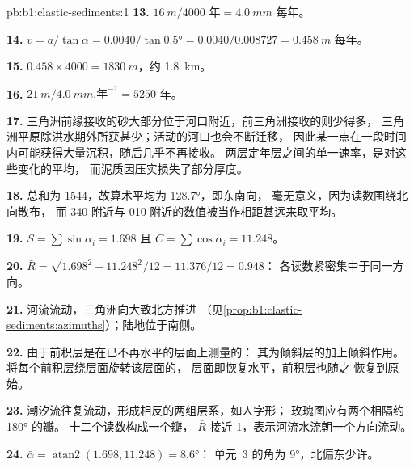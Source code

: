 \begin{solution}{pb:b1:clastic-sediments:1}
\textbf{13.} $\qty{16}{m}/\num{4000}\text{ 年} = \qty{4.0}{mm}$ 每年。

\textbf{14.} $v = a/\tan\alpha = 0.0040/\tan\ang{0.5} = 0.0040/0.008727 =
\qty{0.458}{m}$ 每年。

\textbf{15.} $0.458 \times 4000 = \qty{1830}{m}$，约 \qty{1.8}{km}。

\textbf{16.} $\qty{21}{m}/\qty{4.0}{mm.\text{年}^{-1}} = 5250$ 年。

\textbf{17.} 三角洲前缘接收的砂大部分位于河口附近，前三角洲接收的则少得多，
三角洲平原除洪水期外所获甚少；活动的河口也会不断迁移，
因此某一点在一段时间内可能获得大量沉积，随后几乎不再接收。
两层定年层之间的单一速率，是对这些变化的平均，
而泥质因压实损失了部分厚度。

\textbf{18.} 总和为 1544，故算术平均为 \ang{128.7}，即东南向，
毫无意义，因为读数围绕北向散布，
而 340 附近与 010 附近的数值被当作相距甚远来取平均。

\textbf{19.} $S = \sum\sin\alpha_i = 1.698$ 且 $C = \sum\cos\alpha_i =
11.248$。

\textbf{20.} $\bar R = \sqrt{1.698^2 + 11.248^2}/12 = 11.376/12 = 0.948$：
各读数紧密集中于同一方向。

\textbf{21.} 河流流动，三角洲向大致北方推进
（见\cref{prop:b1:clastic-sediments:azimuths}）；陆地位于南侧。

\textbf{22.} 由于前积层是在已不再水平的层面上测量的：
其为倾斜层的加上倾斜作用。
将每个前积层绕层面旋转该层面的，
层面即恢复水平，前积层也随之
恢复到原始。

\textbf{23.} 潮汐流往复流动，形成相反的两组层系，如人字形；
玫瑰图应有两个相隔约 \ang{180} 的瓣。
十二个读数构成一个瓣，
$\bar R$ 接近 1，表示河流水流朝一个方向流动。

\textbf{24.} $\bar\alpha = \operatorname{atan2}(1.698, 11.248) = \ang{8.6}$：
单元~3 的角为 \ang{9}，北偏东少许。
\end{solution}
